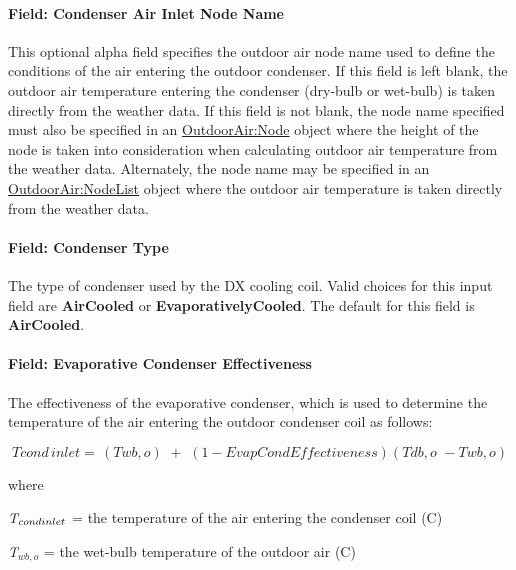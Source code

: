 \paragraph{Field: Condenser Air Inlet Node Name}\label{field-condenser-air-inlet-node-name}

This optional alpha field specifies the outdoor air node name used to define the conditions of the air entering the outdoor condenser. If this field is left blank, the outdoor air temperature entering the condenser (dry-bulb or wet-bulb) is taken directly from the weather data. If this field is not blank, the node name specified must also be specified in an \hyperref[outdoorairnode]{OutdoorAir:Node} object where the height of the node is taken into consideration when calculating outdoor air temperature from the weather data. Alternately, the node name may be specified in an \hyperref[outdoorairnodelist]{OutdoorAir:NodeList} object where the outdoor air temperature is taken directly from the weather data.

\paragraph{Field: Condenser Type}\label{field-condenser-type}

The type of condenser used by the DX cooling coil. Valid choices for this input field are \textbf{AirCooled} or \textbf{EvaporativelyCooled}. The default for this field is \textbf{AirCooled}.

\paragraph{Field: Evaporative Condenser Effectiveness}\label{field-evaporative-condenser-effectiveness}

The effectiveness of the evaporative condenser, which is used to determine the temperature of the air entering the outdoor condenser coil as follows:

\begin{equation}
Tcond\,inlet = \,\left( {Twb,o} \right)\,\, + \,\,\left( {1 - EvapCondEffectiveness} \right)\left( {Tdb,o\,\, - Twb,o} \right)
\end{equation}

where

\emph{T\(_{cond\\ inlet}\)} = the temperature of the air entering the condenser coil (C)

\emph{T\(_{wb,o}\)} = the wet-bulb temperature of the outdoor air (C)

